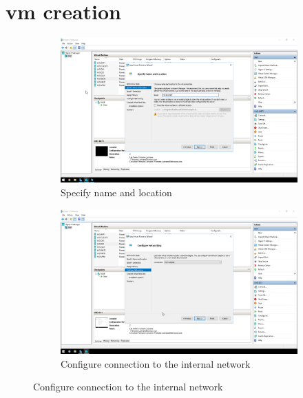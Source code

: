 \label{Migration}
\section{\acrshort{vm} creation}
\begin{figure}[!htb]
	\begin{subfigure}{0.5\textwidth}
		\captionsetup{width=0.8\linewidth}
		\includegraphics[width=0.9\linewidth]{img/Methodologie/Migration0.png}
		\centering
		\caption{Specify name and location}
	\end{subfigure}
	\begin{subfigure}{0.5\textwidth}
		\captionsetup{width=0.8\linewidth}
		\includegraphics[width=0.9\linewidth]{img/Methodologie/Migration1.png} 
		\centering
		\caption{Configure connection to the internal network}
	\end{subfigure}
\end{figure}
